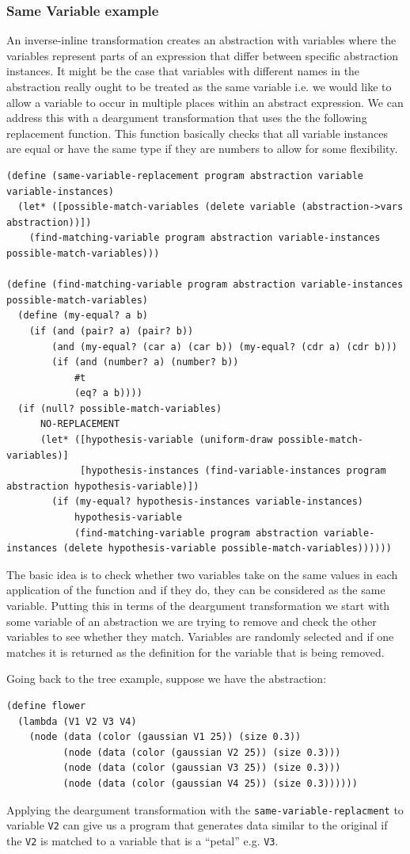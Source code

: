 \documentclass[a4paper,10pt]{article}
\begin{document}
\subsubsection{Same Variable example}
An inverse-inline transformation creates an abstraction with variables where the variables represent parts of an expression that differ between specific abstraction instances.  It might be the case that variables with different names in the abstraction really ought to be treated as the same variable i.e. we would like to allow a variable to occur in multiple places within an abstract expression.  We can address this with a deargument transformation that uses the the following replacement function.  This function basically checks that all variable instances are equal or have the same type if they are numbers to allow for some flexibility.
\begin{lstlisting}[frame=trBL]
(define (same-variable-replacement program abstraction variable variable-instances)
  (let* ([possible-match-variables (delete variable (abstraction->vars abstraction))])
    (find-matching-variable program abstraction variable-instances possible-match-variables)))

(define (find-matching-variable program abstraction variable-instances possible-match-variables)
  (define (my-equal? a b) 
    (if (and (pair? a) (pair? b)) 
        (and (my-equal? (car a) (car b)) (my-equal? (cdr a) (cdr b))) 
        (if (and (number? a) (number? b))
            #t
            (eq? a b)))) 
  (if (null? possible-match-variables)
      NO-REPLACEMENT
      (let* ([hypothesis-variable (uniform-draw possible-match-variables)]
             [hypothesis-instances (find-variable-instances program abstraction hypothesis-variable)])
        (if (my-equal? hypothesis-instances variable-instances)
            hypothesis-variable
            (find-matching-variable program abstraction variable-instances (delete hypothesis-variable possible-match-variables))))))
\end{lstlisting}
The basic idea is to check whether two variables take on the same values in each application of the function and if they do, they can be considered as the same variable.  Putting this in terms of the deargument transformation we start with some variable of an abstraction we are trying to remove and check the other variables to see whether they match.  Variables are randomly selected and if one matches it is returned as the definition for the variable that is being removed.  

Going back to the tree example, suppose we have the abstraction:
\begin{lstlisting}
(define flower
  (lambda (V1 V2 V3 V4)
    (node (data (color (gaussian V1 25)) (size 0.3))
          (node (data (color (gaussian V2 25)) (size 0.3)))
          (node (data (color (gaussian V3 25)) (size 0.3)))
          (node (data (color (gaussian V4 25)) (size 0.3))))))
\end{lstlisting}
Applying the deargument transformation with the \texttt{same-variable-replacment} to variable \texttt{V2} can give us a program that generates data similar to the original if the \texttt{V2} is matched to a variable that is a ``petal'' e.g. \texttt{V3}.
\end{document}
